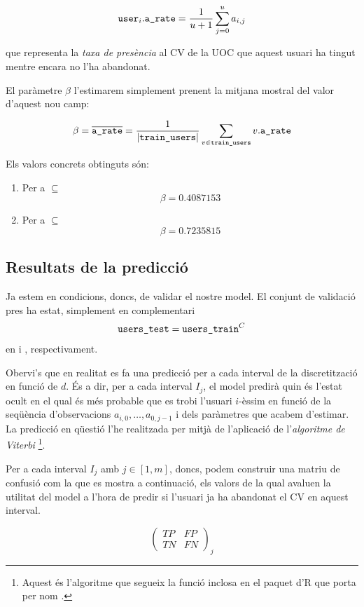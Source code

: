 \documentclass[
	a4paper,
	twoside,
	justified
]{tufte-book}
\begin{document}
$$
	\texttt{user}_i.\texttt{a\_rate} = \frac{1}{u+1} \sum_{j = 0}^u a_{i,j}
$$ 

que representa la \emph{taxa de presència} al CV de la UOC que aquest usuari ha tingut mentre encara no l'ha abandonat. 

El paràmetre $\beta$ l'estimarem simplement prenent la mitjana mostral del valor d'aquest nou camp:

$$
	\beta = \overline{\texttt{a\_rate}} = \frac{1}{|\texttt{train\_users}|} \sum_{v \in \texttt{train\_users}} v.\texttt{a\_rate}
$$

Els valors concrets obtinguts són:

\begin{enumerate}
	\item Per a  $\subseteq$ 
		$$
			 \beta = 0.4087153
		$$ 
	\item Per a  $\subseteq$ 	
		$$
			 \beta = 0.7235815
		$$
\end{enumerate}

\subsection{Resultats de la predicció}

Ja estem en condicions, doncs, de validar el nostre model. El conjunt de validació pres ha estat, simplement en complementari 
$$
\texttt{users\_test} = \texttt{users\_train}^C
$$
en  i , respectivament. 

Obervi's que en realitat es fa una predicció per a cada interval de la discretització en funció de $d$. És a dir, per a cada interval $I_j$, el model predirà quin és l'estat ocult en el qual és més probable que es trobi l'usuari $i$-èssim en funció de la seqüència d'observacions $a_{i,0},\ldots,a_{0,j-1}$ i dels paràmetres que acabem d'estimar. La predicció en qüestió l'he realitzada per mitjà de l'aplicació de l'\emph{algoritme de Viterbi} \citep{viterbi67} \footnote{Aquest és l'algoritme que segueix la funció  inclosa en el paquet d'R que porta per nom  \citep{himmelmann10}.}. 

Per a cada interval $I_j$ amb $j \in [1,m]$, doncs, podem construir una matriu de confusió com la que es mostra a continuació, els valors de la qual avaluen la utilitat del model a l'hora de predir si l'usuari ja ha abandonat el CV en aquest interval. 

$$
\begin{pmatrix}
TP & FP \\
TN & FN
\end{pmatrix}_j
$$
\end{document}
